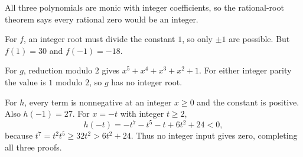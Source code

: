 All three polynomials are monic with integer coefficients, so the rational-root theorem says every rational zero would be an integer.

For $f$, an integer root must divide the constant $1$, so only $\pm1$ are possible. But $f(1)=30$ and $f(-1)=-18$.

For $g$, reduction modulo $2$ gives $x^5+x^4+x^3+x^2+1$. For either integer parity the value is $1$ modulo $2$, so $g$ has no integer root.

For $h$, every term is nonnegative at an integer $x\ge0$ and the constant is positive. Also $h(-1)=27$. For $x=-t$ with integer $t\ge2$,
\[
h(-t)=-t^7-t^5-t+6t^2+24<0,
\]
because $t^7=t^2t^5\ge32t^2>6t^2+24$. Thus no integer input gives zero, completing all three proofs.
